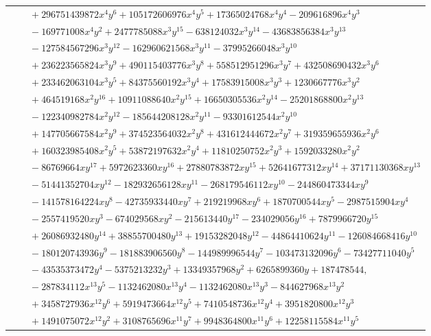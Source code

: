 \documentclass[11pt]{article}
\begin{document}
\begin{longtable}{@{}ll@{}}
 & $\quad +296751439872x^{4}y^{6}+105172606976x^{4}y^{5}+17365024768x^{4}y^{4}-209616896x^{4}y^{3}$\\
 & $\quad -169771008x^{4}y^{2}+2477785088x^{3}y^{15}-638124032x^{3}y^{14}-43683856384x^{3}y^{13}$\\
 & $\quad -127584567296x^{3}y^{12}-162960621568x^{3}y^{11}-37995266048x^{3}y^{10}$\\
 & $\quad +236223565824x^{3}y^{9}+490115403776x^{3}y^{8}+558512951296x^{3}y^{7}+432508690432x^{3}y^{6}$\\
 & $\quad +233462063104x^{3}y^{5}+84375560192x^{3}y^{4}+17583915008x^{3}y^{3}+1230667776x^{3}y^{2}$\\
 & $\quad +464519168x^{2}y^{16}+10911088640x^{2}y^{15}+16650305536x^{2}y^{14}-25201868800x^{2}y^{13}$\\
 & $\quad -122340982784x^{2}y^{12}-185644208128x^{2}y^{11}-93301612544x^{2}y^{10}$\\
 & $\quad +147705667584x^{2}y^{9}+374523564032x^{2}y^{8}+431612444672x^{2}y^{7}+319359655936x^{2}y^{6}$\\
 & $\quad +160323985408x^{2}y^{5}+53872197632x^{2}y^{4}+11810250752x^{2}y^{3}+1592033280x^{2}y^{2}$\\
 & $\quad -86769664xy^{17}+5972623360xy^{16}+27880783872xy^{15}+52641677312xy^{14}+37171130368xy^{13}$\\
 & $\quad -51441352704xy^{12}-182932656128xy^{11}-268179546112xy^{10}-244860473344xy^{9}$\\
 & $\quad -141578164224xy^{8}-42735933440xy^{7}+219219968xy^{6}+1870700544xy^{5}-2987515904xy^{4}$\\
 & $\quad -2557419520xy^{3}-674029568xy^{2}-215613440y^{17}-234029056y^{16}+7879966720y^{15}$\\
 & $\quad +26086932480y^{14}+38855700480y^{13}+19153282048y^{12}-44864410624y^{11}-126084668416y^{10}$\\
 & $\quad -180120743936y^{9}-181883906560y^{8}-144989996544y^{7}-103473132096y^{6}-73427711040y^{5}$\\
 & $\quad -43535373472y^{4}-5375213232y^{3}+13349357968y^{2}+6265899360y+187478544,$\\
 & $\quad -287834112x^{13}y^{5}-1132462080x^{13}y^{4}-1132462080x^{13}y^{3}-844627968x^{13}y^{2}$\\
 & $\quad +3458727936x^{12}y^{6}+5919473664x^{12}y^{5}+7410548736x^{12}y^{4}+3951820800x^{12}y^{3}$\\
 & $\quad +1491075072x^{12}y^{2}+3108765696x^{11}y^{7}+9948364800x^{11}y^{6}+12258115584x^{11}y^{5}$\\

\end{longtable}
\end{document}
